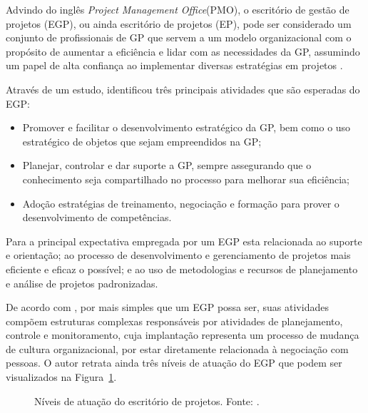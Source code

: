 Advindo do inglês \textit{Project Management Office}(PMO), o escritório de gestão de projetos (EGP), ou ainda escritório de projetos (EP), pode ser considerado um conjunto de profissionais de GP que servem a um modelo organizacional com o propósito de aumentar a eficiência e lidar com as necessidades da GP, assumindo um papel de alta confiança ao implementar diversas estratégias em projetos \cite{kendall2003advanced}.

Através de um estudo,  identificou três principais atividades que são esperadas do EGP:

\begin{itemize}
  \item Promover e facilitar o desenvolvimento estratégico da GP, bem como o uso estratégico de objetos que sejam empreendidos na GP;
  \item Planejar, controlar e dar suporte a GP, sempre assegurando que o conhecimento seja compartilhado no processo para melhorar sua eficiência;
  \item Adoção estratégias de treinamento, negociação e formação para prover o desenvolvimento de competências.
\end{itemize}

Para  a principal expectativa empregada por um EGP esta relacionada ao suporte e orientação; ao processo de desenvolvimento e gerenciamento de projetos mais eficiente e eficaz o possível; e ao uso de metodologias e recursos de planejamento e análise de projetos padronizadas.

De acordo com , por mais simples que um EGP possa ser, suas atividades compõem estruturas complexas responsáveis por atividades de planejamento, controle e monitoramento, cuja implantação representa um processo de mudança de cultura organizacional, por estar diretamente relacionada à negociação com pessoas. O autor retrata ainda três níveis de atuação do EGP que podem ser visualizados na Figura~\ref{pmo_crawford}.


\begin{figure}[ht]
  \centering
  \caption{Níveis de atuação do escritório de projetos. Fonte: \cite{crawford2010strategic}.}
  \label{pmo_crawford}
\end{figure}

